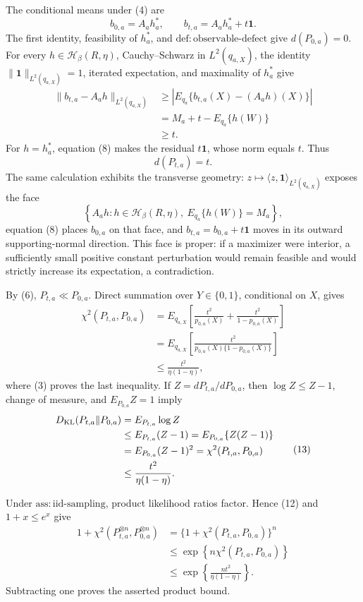 The conditional means under (4) are
\[
b_{0,a}=A_ah_a^*,
\qquad
b_{t,a}=A_ah_a^*+t\mathbf 1.
\tag{8}
\]
The first identity, feasibility of \(h_a^*\), and \(\mathrm{def:observable\mbox{-}defect}\) give \(d(P_{0,a})=0\). For every \(h\in\mathcal H_\beta(R,\eta)\), Cauchy--Schwarz in \(L^2(q_{a,X})\), the identity \(\|\mathbf1\|_{L^2(q_{a,X})}=1\), iterated expectation, and maximality of \(h_a^*\) give
\[
\begin{aligned}
\|b_{t,a}-A_ah\|_{L^2(q_{a,X})}
&\ge \left|E_{q_a}\{b_{t,a}(X)-(A_ah)(X)\}\right|\\
&=M_a+t-E_{q_a}\{h(W)\}\\
&\ge t.
\end{aligned}
\tag{9}
\]
For \(h=h_a^*\), equation (8) makes the residual \(t\mathbf1\), whose norm equals \(t\). Thus
\[
d(P_{t,a})=t.
\tag{10}
\]
The same calculation exhibits the transverse geometry: \(z\mapsto\langle z,\mathbf1\rangle_{L^2(q_{a,X})}\) exposes the face
\[
\left\{A_ah:h\in\mathcal H_\beta(R,\eta),\ E_{q_a}\{h(W)\}=M_a\right\},
\tag{11}
\]
equation (8) places \(b_{0,a}\) on that face, and \(b_{t,a}=b_{0,a}+t\mathbf1\) moves in its outward supporting-normal direction. This face is proper: if a maximizer were interior, a sufficiently small positive constant perturbation would remain feasible and would strictly increase its expectation, a contradiction.

By (6), \(P_{t,a}\ll P_{0,a}\). Direct summation over \(Y\in\{0,1\}\), conditional on \(X\), gives
\[
\begin{aligned}
\chi^2(P_{t,a},P_{0,a})
&=E_{q_{a,X}}\!\left[
  \frac{t^2}{p_{0,a}(X)}+
  \frac{t^2}{1-p_{0,a}(X)}\right]\\
&=E_{q_{a,X}}\!\left[
  \frac{t^2}{p_{0,a}(X)\{1-p_{0,a}(X)\}}\right]\\
&\le\frac{t^2}{\eta(1-\eta)},
\end{aligned}
\tag{12}
\]
where (3) proves the last inequality. If \(Z=dP_{t,a}/dP_{0,a}\), then \(\log Z\le Z-1\), change of measure, and \(E_{P_{0,a}}Z=1\) imply
\[
\begin{aligned}
D_{\rm KL}(P_{t,a}\|P_{0,a})
&=E_{P_{t,a}}\log Z\\
&\le E_{P_{t,a}}(Z-1)
=E_{P_{0,a}}\{Z(Z-1)\}\\
&=E_{P_{0,a}}(Z-1)^2
=\chi^2(P_{t,a},P_{0,a})\\
&\le\frac{t^2}{\eta(1-\eta)}.
\end{aligned}
\tag{13}
\]

Under \(\mathrm{ass:iid\mbox{-}sampling}\), product likelihood ratios factor. Hence (12) and \(1+x\le e^x\) give
\[
\begin{aligned}
1+\chi^2(P_{t,a}^{\otimes n},P_{0,a}^{\otimes n})
&=\{1+\chi^2(P_{t,a},P_{0,a})\}^n\\
&\le\exp\!\left\{n\chi^2(P_{t,a},P_{0,a})\right\}\\
&\le\exp\!\left\{\frac{nt^2}{\eta(1-\eta)}\right\}.
\end{aligned}
\tag{14}
\]
Subtracting one proves the asserted product bound.

